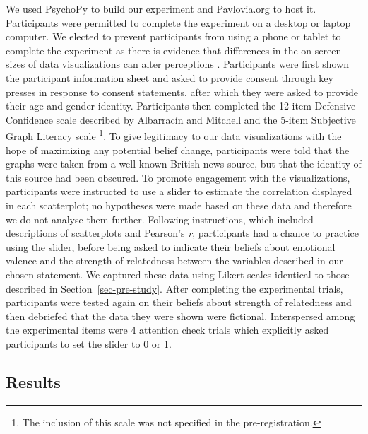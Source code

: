 \documentclass[manuscript,screen,review,anonymous]{acmart}
\begin{document}
We used PsychoPy \citep{pierce_2019} to build our experiment and
Pavlovia.org to host it. Participants were permitted to complete the
experiment on a desktop or laptop computer. We elected to prevent
participants from using a phone or tablet to complete the experiment as
there is evidence that differences in the on-screen sizes of data
visualizations can alter perceptions \citep{cleveland_1982}.
Participants were first shown the participant information sheet and
asked to provide consent through key presses in response to consent
statements, after which they were asked to provide their age and gender
identity. Participants then completed the 12-item Defensive Confidence
scale described by Albarracín and Mitchell \citep{albarracin_2004} and
the 5-item Subjective Graph Literacy scale \citep{garcia_2016}
\footnote{The inclusion of this scale was not specified in the
  pre-registration.}. To give legitimacy to our data visualizations with
the hope of maximizing any potential belief change, participants were
told that the graphs were taken from a well-known British news source,
but that the identity of this source had been obscured. To promote
engagement with the visualizations, participants were instructed to use
a slider to estimate the correlation displayed in each scatterplot; no
hypotheses were made based on these data and therefore we do not analyse
them further. Following instructions, which included descriptions of
scatterplots and Pearson's \emph{r}, participants had a chance to
practice using the slider, before being asked to indicate their beliefs
about emotional valence and the strength of relatedness between the
variables described in our chosen statement. We captured these data
using Likert scales identical to those described in
Section~\ref{sec-pre-study}. After completing the experimental trials,
participants were tested again on their beliefs about strength of
relatedness and then debriefed that the data they were shown were
fictional. Interspersed among the experimental items were 4 attention
check trials which explicitly asked participants to set the slider to 0
or 1.

\subsection{Results}\label{sec-results-main}
\end{document}
